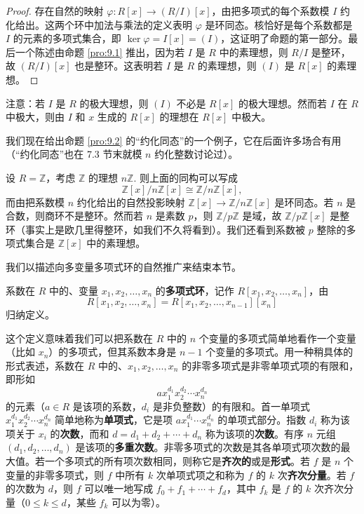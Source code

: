 \begin{proof}
存在自然的映射 \(\varphi : R[x] \to (R/I)[x]\)，由把多项式的每个系数模 \(I\) 约化给出。这两个环中加法与乘法的定义表明 \(\varphi\) 是环同态。核恰好是每个系数都是 \(I\) 的元素的多项式集合，即 \(\ker\varphi = I[x] = (I)\)，这证明了命题的第一部分。最后一个陈述由命题 \ref{pro:9.1} 推出，因为若 \(I\) 是 \(R\) 中的素理想，则 \(R/I\) 是整环，故 \((R/I)[x]\) 也是整环。这表明若 \(I\) 是 \(R\) 的素理想，则 \((I)\) 是 \(R[x]\) 的素理想。
\end{proof}

注意：若 \(I\) 是 \(R\) 的极大理想，则 \((I)\) 不必是 \(R[x]\) 的极大理想。然而若 \(I\) 在 \(R\) 中极大，则由 \(I\) 和 \(x\) 生成的 \(R[x]\) 的理想在 \(R[x]\) 中极大。

我们现在给出命题 \ref{pro:9.2} 的“约化同态”的一个例子，它在后面许多场合有用（“约化同态”也在 7.3 节末就模 \(n\) 约化整数讨论过）。

\begin{example}
设 \(R = \mathbb{Z}\)，考虑 \(\mathbb{Z}\) 的理想 \(n\mathbb{Z}\). 则上面的同构可以写成
\[
\mathbb{Z}[x]/n\mathbb{Z}[x] \cong \mathbb{Z}/n\mathbb{Z}[x],
\]
而由把系数模 \(n\) 约化给出的自然投影映射 \(\mathbb{Z}[x] \to \mathbb{Z}/n\mathbb{Z}[x]\) 是环同态。若 \(n\) 是合数，则商环不是整环。然而若 \(n\) 是素数 \(p\)，则 \(\mathbb{Z}/p\mathbb{Z}\) 是域，故 \(\mathbb{Z}/p\mathbb{Z}[x]\) 是整环（事实上是欧几里得整环，如我们不久将看到）。我们还看到系数被 \(p\) 整除的多项式集合是 \(\mathbb{Z}[x]\) 中的素理想。
\end{example}

我们以描述向多变量多项式环的自然推广来结束本节。

\begin{definition}
系数在 \(R\) 中的、变量 \(x_1, x_2, \ldots, x_n\) 的\textbf{多项式环}，记作 \(R[x_1, x_2, \ldots, x_n]\)，由
\[
R[x_1, x_2, \ldots, x_n] = R[x_1, x_2, \ldots, x_{n-1}][x_n]
\]
归纳定义。
\end{definition}

这个定义意味着我们可以把系数在 \(R\) 中的 \(n\) 个变量的多项式简单地看作一个变量（比如 \(x_n\)）的多项式，但其系数本身是 \(n-1\) 个变量的多项式。用一种稍具体的形式表述，系数在 \(R\) 中的、\(x_1, x_2, \ldots, x_n\) 的非零多项式是非零单项式项的有限和，即形如
\[
a x_1^{d_1}x_2^{d_2}\cdots x_n^{d_n}
\]
的元素（\(a \in R\) 是该项的系数，\(d_i\) 是非负整数）的有限和。首一单项式 \(x_1^{d_1}x_2^{d_2}\cdots x_n^{d_n}\) 简单地称为\textbf{单项式}，它是项 \(ax_1^{d_1}\cdots x_n^{d_n}\) 的单项式部分。指数 \(d_i\) 称为该项关于 \(x_i\) 的\textbf{次数}，而和 \(d = d_1+d_2+\cdots+d_n\) 称为该项的\textbf{次数}。有序 \(n\) 元组 \((d_1, d_2, \ldots, d_n)\) 是该项的\textbf{多重次数}。非零多项式的次数是其各单项式项次数的最大值。若一个多项式的所有项次数相同，则称它是\textbf{齐次的}或是\textbf{形式}。若 \(f\) 是 \(n\) 个变量的非零多项式，则 \(f\) 中所有 \(k\) 次单项式项之和称为 \(f\) 的 \(k\) 次\textbf{齐次分量}。若 \(f\) 的次数为 \(d\)，则 \(f\) 可以唯一地写成 \(f_0 + f_1 + \cdots + f_d\)，其中 \(f_k\) 是 \(f\) 的 \(k\) 次齐次分量（\(0 \leq k \leq d\)，某些 \(f_k\) 可以为零）。

